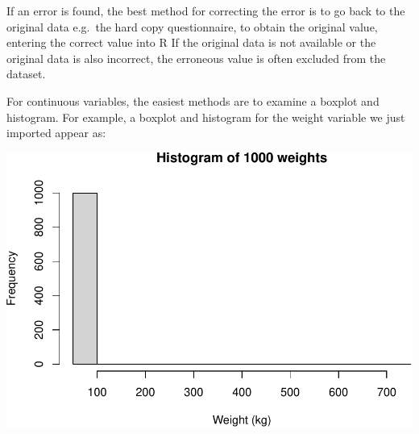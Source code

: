 \documentclass[
]{memoir}
\newenvironment{Shaded}{\begin{snugshade}}{\end{snugshade}}
\newcommand{\AttributeTok}[1]{\textcolor[rgb]{0.77,0.63,0.00}{#1}}
\newcommand{\FunctionTok}[1]{\textcolor[rgb]{0.00,0.00,0.00}{#1}}
\newcommand{\NormalTok}[1]{#1}
\newcommand{\SpecialCharTok}[1]{\textcolor[rgb]{0.00,0.00,0.00}{#1}}
\newcommand{\StringTok}[1]{\textcolor[rgb]{0.31,0.60,0.02}{#1}}
\begin{document}
If an error is found, the best method for correcting the error is to go back to the original data e.g.~the hard copy questionnaire, to obtain the original value, entering the correct value into R If the original data is not available or the original data is also incorrect, the erroneous value is often excluded from the dataset.

For continuous variables, the easiest methods are to examine a boxplot and histogram. For example, a boxplot and histogram for the weight variable we just imported appear as:

\begin{Shaded}
\end{Shaded}

\includegraphics{02.1-Probability_files/figure-latex/unnamed-chunk-3-1.pdf}

\begin{Shaded}
\end{Shaded}
\end{document}
